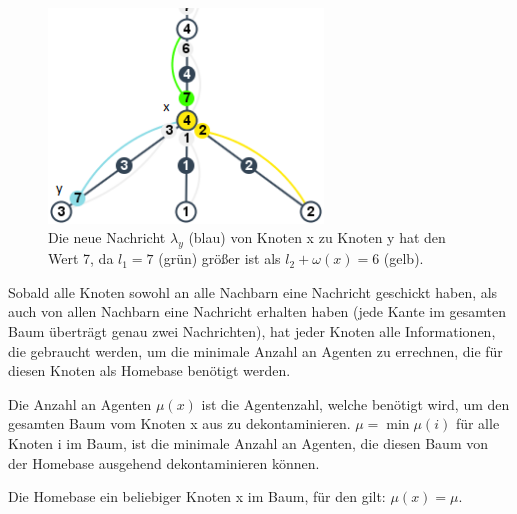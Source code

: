 \begin{enumerate}
		
		\begin{figure}[htb]
			\includegraphics[width=0.65\textwidth]{bilder/abb_paper_nknoten.png}
			\captionsetup{width=0.65\textwidth}
			\caption{Die neue Nachricht $\lambda_{y}$ (blau) von Knoten x zu Knoten y hat den Wert 7, da $l_{1} = 7$ (grün) größer ist als $l_{2} + \omega(x) = 6$ (gelb).}
			\label{abb_n}
		\end{figure}
		
	
		
		
\end{enumerate}



\vspace{2\baselineskip}
Sobald alle Knoten sowohl an alle Nachbarn eine Nachricht geschickt haben, als auch von allen Nachbarn eine Nachricht erhalten haben (jede Kante im gesamten Baum überträgt genau zwei Nachrichten), hat jeder Knoten alle Informationen, die gebraucht werden, um die minimale Anzahl an Agenten zu errechnen, die für diesen Knoten als Homebase benötigt werden.

\begin{mydef}
	Die Anzahl an Agenten $\mu(x)$ ist die Agentenzahl, welche benötigt wird, um den gesamten Baum vom Knoten x aus zu dekontaminieren. $\mu = \min \mu(i)$ für alle Knoten i im Baum, ist die minimale Anzahl an Agenten, die diesen Baum von der Homebase ausgehend dekontaminieren können.
\end{mydef}

\begin{mydef}\label{def_homebase}
	Die Homebase ein beliebiger Knoten x im Baum, für den gilt: $\mu(x) = \mu$.
\end{mydef}

